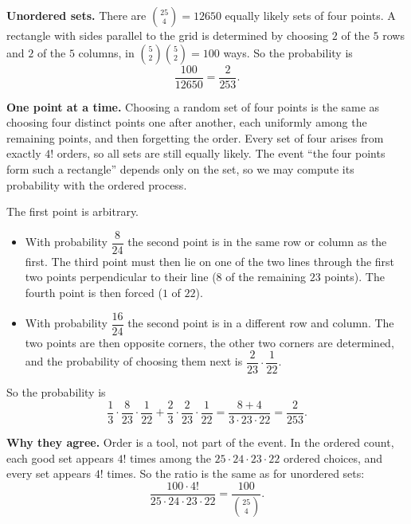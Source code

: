 \textbf{Unordered sets.} There are $\binom{25}{4}=12650$ equally likely sets of four points. A rectangle with sides parallel to the grid is determined by choosing $2$ of the $5$ rows and $2$ of the $5$ columns, in $\binom52\binom52=100$ ways. So the probability is
\[
\dfrac{100}{12650}=\dfrac{2}{253}.
\]

\textbf{One point at a time.} Choosing a random set of four points is the same as choosing four distinct points one after another, each uniformly among the remaining points, and then forgetting the order. Every set of four arises from exactly $4!$ orders, so all sets are still equally likely. The event ``the four points form such a rectangle'' depends only on the set, so we may compute its probability with the ordered process.

The first point is arbitrary.
\begin{itemize}
\item With probability $\dfrac{8}{24}$ the second point is in the same row or column as the first. The third point must then lie on one of the two lines through the first two points perpendicular to their line ($8$ of the remaining $23$ points). The fourth point is then forced ($1$ of $22$).
\item With probability $\dfrac{16}{24}$ the second point is in a different row and column. The two points are then opposite corners, the other two corners are determined, and the probability of choosing them next is $\dfrac{2}{23}\cdot\dfrac{1}{22}$.
\end{itemize}
So the probability is
\[
\dfrac{1}{3}\cdot\dfrac{8}{23}\cdot\dfrac{1}{22}+\dfrac{2}{3}\cdot\dfrac{2}{23}\cdot\dfrac{1}{22}=\dfrac{8+4}{3\cdot23\cdot22}=\boxed{\dfrac{2}{253}}.
\]

\textbf{Why they agree.} Order is a tool, not part of the event. In the ordered count, each good set appears $4!$ times among the $25\cdot24\cdot23\cdot22$ ordered choices, and every set appears $4!$ times. So the ratio is the same as for unordered sets:
\[
\dfrac{100\cdot4!}{25\cdot24\cdot23\cdot22}=\dfrac{100}{\binom{25}4}.
\]
